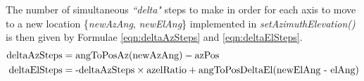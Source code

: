 \noindent The number of simultaneous \textit{``delta"} steps to make in order for each axis to move to a new location \{\textit{newAzAng}, \textit{newElAng}\} implemented in \textit{setAzimuthElevation()} is then given by Formulae \ref{eqn:deltaAzSteps} and \ref{eqn:deltaElSteps}.
\begin{align}
    \textnormal{deltaAzSteps} &= \textnormal{angToPosAz(newAzAng)} - \textnormal{azPos} \label{eqn:deltaAzSteps} \\ 
    \textnormal{deltaElSteps} &= \textnormal{-deltaAzSteps} \times \textnormal{azelRatio} + \textnormal {angToPosDeltaEl(newElAng - elAng)}\label{eqn:deltaElSteps} 
\end{align}